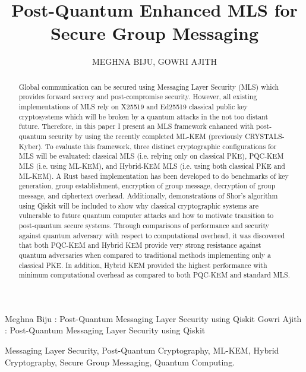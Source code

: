 \documentclass{ieeeaccess}
\begin{document}
\title{Post-Quantum Enhanced MLS for Secure Group Messaging}

\author{\uppercase{Meghna Biju},
\uppercase{Gowri Ajith}}

\address[1]{School of Computer Science and Engineering, VIT Chennai, India}
\address[2]{School of Computer Science and Engineering, VIT Chennai, India}

\markboth
{Meghna Biju \headeretal: Post-Quantum Messaging Layer Security using Qiskit}
{Gowri Ajith \headeretal: Post-Quantum Messaging Layer Security using Qiskit}


\begin{abstract}
Global communication can be secured using Messaging Layer Security (MLS) which provides forward secrecy and post-compromise security. However, all existing implementations of MLS rely on X25519 and Ed25519 classical public key cryptosystems which will be broken by a quantum attacks in the not too distant future. Therefore, in this paper I present an MLS framework enhanced with post-quantum security by using the recently completed ML-KEM (previously CRYSTALS-Kyber). To evaluate this framework, three distinct cryptographic configurations for MLS will be evaluated: classical MLS (i.e. relying only on classical PKE), PQC-KEM MLS (i.e. using ML-KEM), and Hybrid-KEM MLS (i.e. using both classical PKE and ML-KEM). A Rust based implementation has been developed to do benchmarks of key generation, group establishment, encryption of group message, decryption of group message, and ciphertext overhead. Additionally, demonstrations of Shor's algorithm using Qiskit will be included to show why classical cryptographic systems are vulnerable to future quantum computer attacks and how to motivate transition to post-quantum secure systems. Through comparisons of performance and security against quantum adversary with respect to computational overhead, it was discovered that both PQC-KEM and Hybrid KEM provide very strong resistance against quantum adversaries when compared to traditional methods implementing only a classical PKE. In addition, Hybrid KEM provided the highest performance with minimum computational overhead as compared to both PQC-KEM and standard MLS. 
\end{abstract}

\begin{keywords}
Messaging Layer Security, Post-Quantum Cryptography, ML-KEM, Hybrid Cryptography, Secure Group Messaging, Quantum Computing.
\end{keywords}
\end{document}
